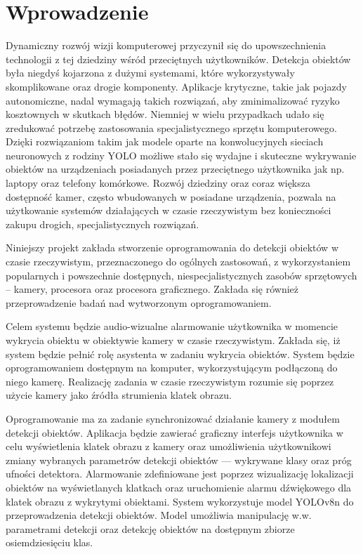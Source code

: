 \chapter{Wprowadzenie}
Dynamiczny rozwój wizji komputerowej przyczynił się do upowszechnienia technologii z tej dziedziny wśród przeciętnych użytkowników. Detekcja obiektów była niegdyś kojarzona z dużymi systemami, które wykorzystywały skomplikowane oraz drogie komponenty. Aplikacje krytyczne, takie jak pojazdy autonomiczne, nadal wymagają takich rozwiązań, aby zminimalizować ryzyko kosztownych w skutkach błędów. Niemniej w wielu przypadkach udało się zredukować potrzebę zastosowania specjalistycznego sprzętu komputerowego. Dzięki rozwiązaniom takim jak modele oparte na konwolucyjnych sieciach neuronowych z rodziny YOLO możliwe stało się wydajne i skuteczne wykrywanie obiektów na urządzeniach posiadanych przez przeciętnego użytkownika jak np. laptopy oraz telefony komórkowe. Rozwój dziedziny oraz coraz większa dostępność kamer, często wbudowanych w posiadane urządzenia, pozwala na użytkowanie systemów działających w czasie rzeczywistym bez konieczności zakupu drogich, specjalistycznych rozwiązań. 

Niniejszy projekt zakłada stworzenie oprogramowania do detekcji obiektów w czasie rzeczywistym, przeznaczonego do ogólnych zastosowań, z wykorzystaniem popularnych i powszechnie dostępnych, niespecjalistycznych zasobów sprzętowych -- kamery, procesora oraz procesora graficznego. Zakłada się również przeprowadzenie badań nad wytworzonym oprogramowaniem.

Celem systemu będzie audio-wizualne alarmowanie użytkownika w momencie wykrycia obiektu w obiektywie kamery w czasie rzeczywistym. Zakłada się, iż system będzie pełnić rolę asystenta w zadaniu wykrycia obiektów. 
System będzie oprogramowaniem dostępnym na komputer, wykorzystującym podłączoną do niego kamerę. Realizację zadania w czasie rzeczywistym rozumie się poprzez użycie kamery jako źródła strumienia klatek obrazu. 

Oprogramowanie ma za zadanie synchronizować działanie kamery z modułem detekcji obiektów. Aplikacja będzie zawierać graficzny interfejs użytkownika w celu wyświetlenia klatek obrazu z kamery oraz umożliwienia użytkownikowi zmiany wybranych parametrów detekcji obiektów --- wykrywane klasy oraz próg ufności detektora. Alarmowanie zdefiniowane jest poprzez wizualizację lokalizacji obiektów na wyświetlanych klatkach oraz uruchomienie alarmu dźwiękowego dla klatek obrazu z wykrytymi obiektami. System wykorzystuje model YOLOv8n do przeprowadzenia detekcji obiektów. Model umożliwia manipulację w.w. parametrami detekcji oraz detekcję obiektów na dostępnym zbiorze osiemdziesięciu klas.  

